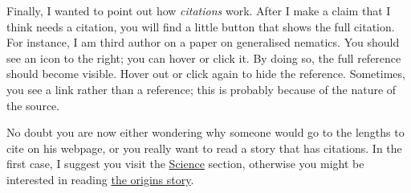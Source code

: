 Finally, I wanted to point out how \emph{citations} work. After I make a claim that I think needs a citation, you will find a little button
that shows the full citation. For instance, I am third author on a paper on generalised nematics. You should see an icon to the right;
you can hover or click it. By doing so, the full reference should become visible. Hover out or click again to hide the reference. Sometimes, you
see a link rather than a reference; this is probably because of the nature of the source.

No doubt you are now either wondering why someone would go to the lengths to cite on his webpage, or you really want to read a story that has
citations. In the first case, I suggest you visit the \href{./science}{Science} section, otherwise you might be interested in reading
\href{./origins}{the origins story}.
